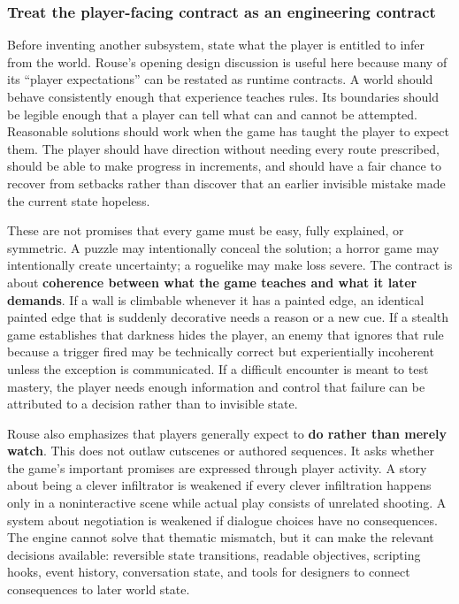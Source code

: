 \subsubsection{Treat the player-facing contract as an engineering contract}\label{05-engine-i-ch009-treat-the-player-facing-contract-as-an-engineering-contract}

Before inventing another subsystem, state what the player is entitled to infer from the world. Rouse's opening design discussion is useful here because many of its ``player expectations'' can be restated as runtime contracts. A world should behave consistently enough that experience teaches rules. Its boundaries should be legible enough that a player can tell what can and cannot be attempted. Reasonable solutions should work when the game has taught the player to expect them. The player should have direction without needing every route prescribed, should be able to make progress in increments, and should have a fair chance to recover from setbacks rather than discover that an earlier invisible mistake made the current state hopeless.

These are not promises that every game must be easy, fully explained, or symmetric. A puzzle may intentionally conceal the solution; a horror game may intentionally create uncertainty; a roguelike may make loss severe. The contract is about \textbf{coherence between what the game teaches and what it later demands}. If a wall is climbable whenever it has a painted edge, an identical painted edge that is suddenly decorative needs a reason or a new cue. If a stealth game establishes that darkness hides the player, an enemy that ignores that rule because a trigger fired may be technically correct but experientially incoherent unless the exception is communicated. If a difficult encounter is meant to test mastery, the player needs enough information and control that failure can be attributed to a decision rather than to invisible state.

Rouse also emphasizes that players generally expect to \textbf{do rather than merely watch}. This does not outlaw cutscenes or authored sequences. It asks whether the game's important promises are expressed through player activity. A story about being a clever infiltrator is weakened if every clever infiltration happens only in a noninteractive scene while actual play consists of unrelated shooting. A system about negotiation is weakened if dialogue choices have no consequences. The engine cannot solve that thematic mismatch, but it can make the relevant decisions available: reversible state transitions, readable objectives, scripting hooks, event history, conversation state, and tools for designers to connect consequences to later world state.

